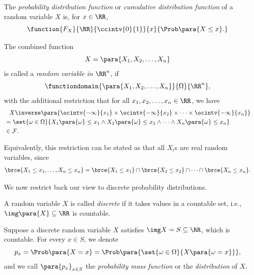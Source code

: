 \begin{definition}
    \label{def:probability-distribution-function}%
    The \emph{probability distribution function} or \emph{cumulative distribution function} of a random variable \(X\) is, for \(x \in \RR\),
    \[
        \function{F_X}{\RR}{\ccintv{0}{1}}{x}{\Prob\para{X \leq x}.}
    \]
\end{definition}

\begin{definition}
    \label{def:random-variable-rn}%
    The combined function
    \[
        X = \para{X_1, X_2, \ldots, X_n}
    \]
    is called a \emph{random variable in \(\RR^n\)}, if
    \[
        \functiondomain{\para{X_1, X_2, \ldots, X_n}}{\Omega}{\RR^n},
    \]
    with the additional restriction that for all \(x_1, x_2, \ldots, x_n \in \RR\), we have
    \begin{align*}
        &\phantom{=} X\inverse\para{\ocintv{-\infty}{x_1} \times \ocintv{-\infty}{x_2} \times \cdots \times \ocintv{-\infty}{x_n}} \\
        &= \set{\omega \in \Omega}{X_1 \para{\omega} \leq x_1 \land X_2 \para{\omega} \leq x_2 \land \cdots \land X_n \para{\omega} \leq x_n} \\
        &\in \mathcal{F}.
    \end{align*}

    Equivalently, this restriction can be stated as that all \(X_i\)s are real random variables, since
    \[
        \brce{X_1 \leq x_1, \ldots, X_n \leq x_n} = \brce{X_1 \leq x_1} \cap \brce{X_2 \leq x_2} \cap \cdots \cap \brce{X_n \leq x_n}.
    \]
\end{definition}

We now restrict back our view to discrete probability distributions.

\begin{definition}
    \label{def:discrete-random-variable}%
    A random variable \(X\) is called \emph{discrete} if it takes values in a countable set, i.e., \(\img \para{X} \subseteq \RR\) is countable.
\end{definition}

\begin{definition}
    \label{def:probability-mass-function}%
    Suppose a discrete random variable \(X\) satisfies \(\img X = S \subseteq \RR\), which is countable. For every \(x \in S\), we denote
    \[
        p_x = \Prob\para{X = x} = \Prob\para{\set{\omega \in \Omega}{X\para{\omega = x}}},
    \]
    and we call \(\para{p_x}_{x \in S}\) the \emph{probability mass function} or the \emph{distribution} of \(X\).
\end{definition}

